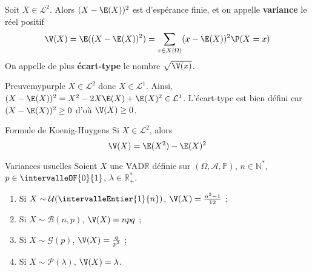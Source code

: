     \begin{defitheo}{}{}
        Soit $X \in \mathcal{L}^2$. Alors $(X - \E(X))^2$ est d’espérance finie, et on appelle \textbf{variance} le réel positif 
        \[ \V(X) = \E((X - \E(X))^2) = \sum_{x \in X(\Omega)} (x- \E(X))^2 \P(X = x) \]   
        On appelle de plus \textbf{écart-type} le nombre $\sqrt{\V(x)}$.
    \end{defitheo}

    \begin{demo}{Preuve}{mypurple}
        $ X \in \mathcal{L}^2$ donc $X \in \mathcal{L}^1$. Ainsi, $(X - \E(X))^2 = X^2 - 2 X \E(X) + \E(X)^2 \in \mathcal{L}^1$. L’écart-type est bien défini car $(X- \E(X))^2 \geq 0$ d’où $\V(X) \geq 0$. 
    \end{demo}

    \begin{prop}{Formule de Koenig-Huygens}{}
        Si $X \in \mathcal{L}^2$, alors 
        \[ \V(X) = \E(X^2) - \E(X)^2 \]   
    \end{prop}

    \begin{theo}{Variances usuelles}{}
        Soient $X$ une VAD$\mathbb{R}$ définie sur $(\Omega, \mathcal{A}, \mathbb{P})$, $n \in \mathbb{N}^*$, $p \in \intervalleOF{0}{1}$, $\lambda \in \mathbb{R}_+^*$.
        \begin{enumerate}
            \item Si $X \sim \mathcal{U}(\intervalleEntier{1}{n})$, $\V(X) = \frac{n^2 - 1}{12}$ ;
            \item Si $X \sim \mathcal{B}(n,p)$, $\V(X) = npq$ ;
            \item Si $X \sim \mathcal{G}(p)$, $\V(X) = \frac{q}{p^2}$ ;
            \item Si $X \sim \mathcal{P}(\lambda)$, $\V(X) = \lambda$.
        \end{enumerate} 
    \end{theo}

